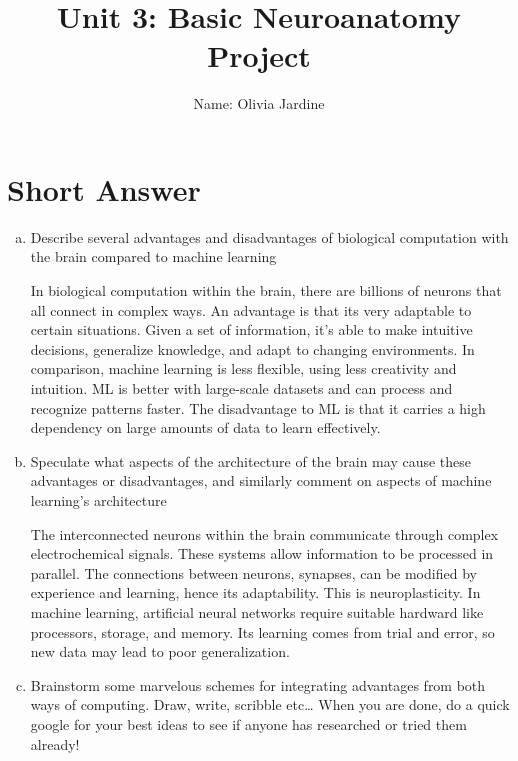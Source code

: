 \documentclass[letterpaper,11pt]{article}
\begin{document}
\title{{\bf Unit 3: Basic Neuroanatomy Project} }
\author{Name: Olivia Jardine}

\date{}
\maketitle

\section*{Short Answer}
\begin{enumerate}[a)]
\item Describe several advantages and disadvantages of biological computation with the brain compared to machine learning

\begin{tcolorbox}
In biological computation within the brain, there are billions of neurons that all connect in complex ways. An advantage is that its very adaptable to certain situations. Given a set of information, it's able to make intuitive decisions, generalize knowledge, and adapt to changing environments. In comparison, machine learning is less flexible, using less creativity and intuition. ML is better with large-scale datasets and can process and recognize patterns faster. The disadvantage to ML is that it carries a high dependency on large amounts of data to learn effectively.
\end{tcolorbox}

\item Speculate what aspects of the architecture of the brain may cause these advantages or disadvantages, and similarly comment on aspects of machine learning’s architecture

\begin{tcolorbox}
The interconnected neurons within the brain communicate through complex electrochemical signals. These systems allow information to be processed in parallel. The connections between neurons, synapses, can be modified by experience and learning, hence its adaptability. This is neuroplasticity. In machine learning, artificial neural networks require suitable hardward like processors, storage, and memory. Its learning comes from trial and error, so new data may lead to poor generalization.
\end{tcolorbox} 

\item Brainstorm some marvelous schemes for integrating advantages from both ways of computing. Draw, write, scribble etc… When you are done, do a quick google for your best ideas to see if anyone has researched or tried them already!


\end{enumerate}
\end{document}
